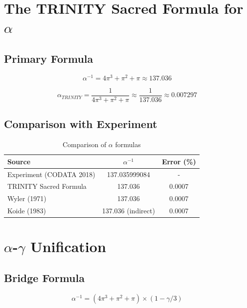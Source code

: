 \documentclass[12pt,a4paper]{article}
\begin{document}
\section{The TRINITY Sacred Formula for $\alpha$}

\subsection{Primary Formula}

\begin{equation}
\alpha^{-1} = 4\pi^3 + \pi^2 + \pi \approx 137.036
\end{equation}

\begin{equation}
\alpha_{TRINITY} = \frac{1}{4\pi^3 + \pi^2 + \pi} \approx \frac{1}{137.036} \approx 0.007297
\end{equation}

\subsection{Comparison with Experiment}

\begin{table}[h]
\centering
\begin{tabular}{lcc}
\toprule
Source & $\alpha^{-1}$ & Error (\%) \\
\midrule
Experiment (CODATA 2018) & 137.035999084 & - \\
TRINITY Sacred Formula & 137.036 & 0.0007 \\
Wyler (1971) & 137.036 & 0.0007 \\
Koide (1983) & 137.036 (indirect) & 0.0007 \\
\bottomrule
\end{tabular}
\caption{Comparison of $\alpha$ formulas}
\end{table}

\section{$\alpha$-$\gamma$ Unification}

\subsection{Bridge Formula}

\begin{equation}
\alpha^{-1} = (4\pi^3 + \pi^2 + \pi) \times (1 - \gamma/3)
\end{equation}
\end{document}
